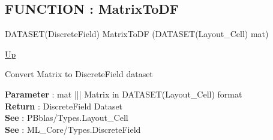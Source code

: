 \subsection*{FUNCTION : MatrixToDF}
\hypertarget{ecldoc:pbblas.converted.matrixtodf}{}
\begin{minipage}[t]{\textwidth}
\begin{flushleft}
DATASET(DiscreteField) MatrixToDF (DATASET(Layout\_Cell) mat)
\end{flushleft}
\end{minipage}
\hyperlink{ecldoc:PBblas.Converted}{Up}

\par
Convert Matrix to DiscreteField dataset
\par
\textbf{Parameter} : mat ||| Matrix in DATASET(Layout\_Cell) format \\
\textbf{Return} : DiscreteField Dataset \\
\textbf{See} : PBblas/Types.Layout\_Cell \\
\textbf{See} : ML\_Core/Types.DiscreteField \\

